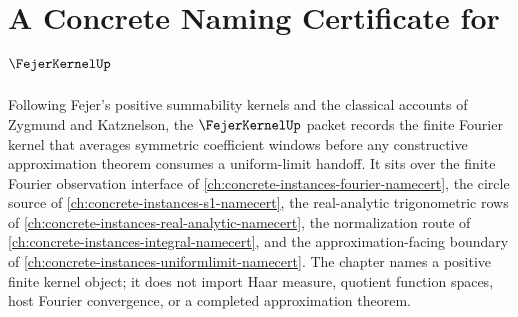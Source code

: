 \chapter{A Concrete Naming Certificate for $\FejerKernelUp$}
\label{ch:concrete-instances-fejer-kernel-namecert}

Following Fejer's positive summability kernels and the classical accounts of Zygmund and Katznelson, the $\FejerKernelUp$ packet records the finite Fourier kernel that averages symmetric coefficient windows before any constructive approximation theorem consumes a uniform-limit handoff. It sits over the finite Fourier observation interface of \autoref{ch:concrete-instances-fourier-namecert}, the circle source of \autoref{ch:concrete-instances-s1-namecert}, the real-analytic trigonometric rows of \autoref{ch:concrete-instances-real-analytic-namecert}, the normalization route of \autoref{ch:concrete-instances-integral-namecert}, and the approximation-facing boundary of \autoref{ch:concrete-instances-uniformlimit-namecert}. The chapter names a positive finite kernel object; it does not import Haar measure, quotient function spaces, host Fourier convergence, or a completed approximation theorem.

